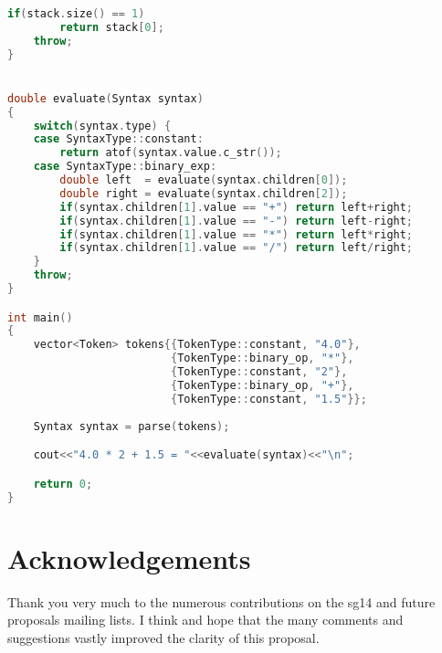 \documentclass{scrartcl}
\begin{document}
{\begin{lstlisting}[language=C++]
    if(stack.size() == 1)
        return stack[0];
    throw;
}


double evaluate(Syntax syntax)
{
    switch(syntax.type) {
    case SyntaxType::constant:
        return atof(syntax.value.c_str());
    case SyntaxType::binary_exp:
        double left  = evaluate(syntax.children[0]);
        double right = evaluate(syntax.children[2]);
        if(syntax.children[1].value == "+") return left+right;
        if(syntax.children[1].value == "-") return left-right;
        if(syntax.children[1].value == "*") return left*right;
        if(syntax.children[1].value == "/") return left/right;
    }
	throw;
}

int main()
{
    vector<Token> tokens{{TokenType::constant, "4.0"},
                         {TokenType::binary_op, "*"},
                         {TokenType::constant, "2"},
                         {TokenType::binary_op, "+"},
                         {TokenType::constant, "1.5"}};
  
    Syntax syntax = parse(tokens);

    cout<<"4.0 * 2 + 1.5 = "<<evaluate(syntax)<<"\n";

    return 0;
}

\end{lstlisting}}

\section{Acknowledgements}
Thank you very much to the numerous contributions on the sg14 and future proposals mailing lists.
I think and hope that the many comments and suggestions vastly improved the clarity of this proposal.
\end{document}
